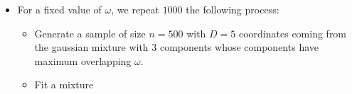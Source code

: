 \documentclass[10pt, a4paper]{article}
\begin{document}
\begin{itemize}
\item For a fixed value of $\omega$, we repeat $1000$ the following process:
\begin{itemize}
\item Generate a sample of size $n=500$ with $D=5$ coordinates coming from the gaussian mixture with $3$ components whose components have maximum overlapping $\omega$.
\item Fit a mixture
\end{itemize}

\end{itemize}




{}
\end{document}
